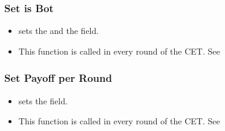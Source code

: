 \documentclass[letterpaper,10pt,english]{sphinxmanual}
\begin{document}
\subsubsection{Set is Bot}
\label{\detokenize{Player_fields:set-is-bot}}\begin{itemize}
\item {} 
 sets the  and the  field.

\item {} 
This function is called in every round of the CET. See {\hyperref[\detokenize{pages:exp-page}]{}}

\end{itemize}


\subsubsection{Set Payoff per Round}
\label{\detokenize{Player_fields:set-payoff-per-round}}\begin{itemize}
\item {} 
 sets the  field.

\item {} 
This function is called in every round of the CET. See {\hyperref[\detokenize{pages:exp-page}]{}}

\end{itemize}
\end{document}
